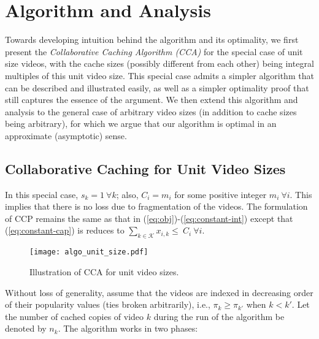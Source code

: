 \documentclass[conference]{IEEEtran}
\begin{document}
\section{Algorithm and Analysis}
\label{sec:algo}

Towards developing intuition behind the algorithm and its optimality, we first present the \textit{Collaborative Caching Algorithm (CCA)} for the special case of unit size videos, with the cache sizes (possibly different from each other) being integral multiples of this unit video size. This special case admits a simpler algorithm that can be described and illustrated easily, as well as a simpler optimality proof that still captures the essence of the argument. We then extend this algorithm and analysis to the general case of arbitrary video sizes (in addition to cache sizes being arbitrary), for which we argue that our algorithm is optimal in an approximate (asymptotic) sense.

\subsection{Collaborative Caching for Unit Video Sizes}
In this special case, $s_k=1 \ \forall k$; also, $C_i = m_i$ for some positive integer $m_i \ \forall i$. This implies that there is no loss due to fragmentation of the videos. The formulation of CCP remains the same as that in (\ref{eq:obj})-(\ref{eq:constant-int}) except that (\ref{eq:constant-cap}) is reduces to $\sum_{k \in \mathcal{K}} x_{i,k}  \leq \  C_i \ \forall i$. 

\begin{figure*}[t]
    \centering
    \texttt{[image: algo\_unit\_size.pdf]}
    \vspace{-0.3in}
    \caption{Illustration of CCA for unit video sizes.}
    \label{fig:algo}
    \vspace{-0.15in}
\end{figure*}

Without loss of generality, assume that the videos are indexed in decreasing order of their popularity values (ties broken arbitrarily), i.e., $\pi_k \geq \pi_{k'}$ when $k<k'$. Let the number of cached copies of video $k$ during the run of the algorithm be denoted by $n_k$. The algorithm works in two phases:
\end{document}
